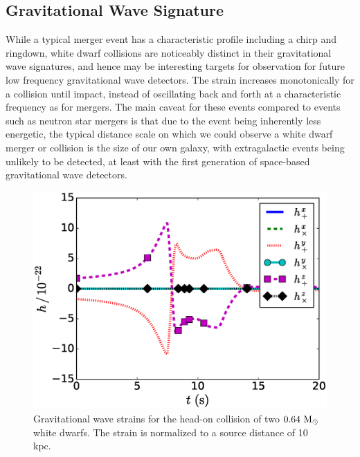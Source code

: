 \documentclass[12pt]{article}
\begin{document}
\clearpage
\subsection{Gravitational Wave Signature}
\label{sec:collision_gravitational_waves}

While a typical merger event has a characteristic profile including a chirp and ringdown,
white dwarf collisions are noticeably distinct in their gravitational wave signatures, and
hence may be interesting targets for observation for future low frequency gravitational
wave detectors. The strain increases monotonically for a collision until impact,
instead of oscillating back and forth at a characteristic frequency as for mergers.
The main caveat for these events compared to events
such as neutron star mergers is that due to the event being inherently less energetic,
the typical distance scale on which we could observe a white dwarf merger or collision
is the size of our own galaxy, with extragalactic events being unlikely to be
detected, at least with the first generation of space-based gravitational wave
detectors.

\begin{figure}
  \centering
  \includegraphics[scale=0.8]{plots/gw_signal_2D}
  \caption[Gravitational wave strain, head-on collision]
          {Gravitational wave strains for the head-on collision of two $0.64\ \mathrm{M}_\odot$
           white dwarfs. The strain is normalized to a source distance of 10 kpc.
           \label{fig:gw_signal_2D}}
\end{figure}
\end{document}
